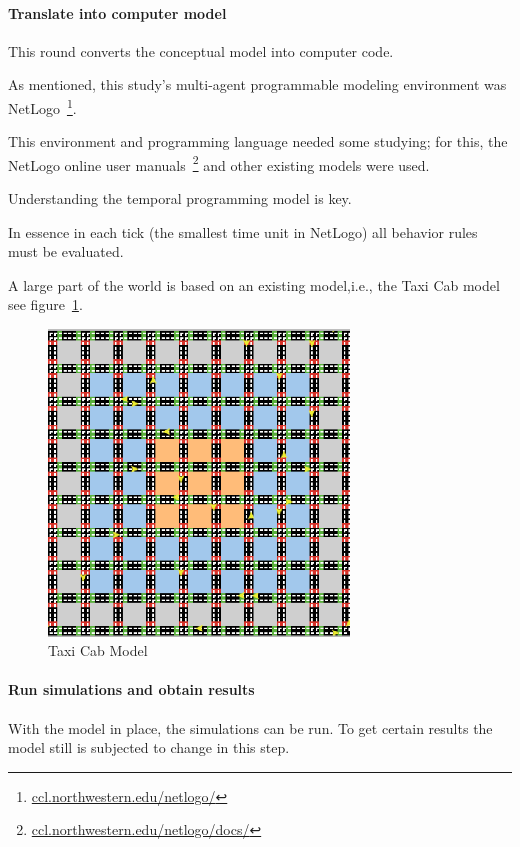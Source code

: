 \paragraph{Translate into computer model}

This round converts the conceptual model into computer code.

As mentioned, this study's multi-agent programmable modeling environment was NetLogo~\footnote{\url{ccl.northwestern.edu/netlogo/}}.

This environment and programming language needed some studying; for this, the NetLogo online user manuals~\footnote{\url{ccl.northwestern.edu/netlogo/docs/}} and other existing models were used.

Understanding the temporal programming model is key.

In essence in each tick (the smallest time unit in NetLogo) all behavior rules must be evaluated.

A large part of the world is based on an existing model,i.e., the Taxi Cab model~\cite{dongpingtaxicabs2019} see figure~\ref{fig:taxicabmodel}.


\begin{figure}
    \centering

    \includegraphics[width=8cm]{sections/pics/Taxi Cabs}

    \caption{Taxi Cab Model}

    \label{fig:taxicabmodel}

\end{figure}



\paragraph{Run simulations and obtain results}
With the model in place, the simulations can be run.
To get certain results the model still is subjected to change in this step.

